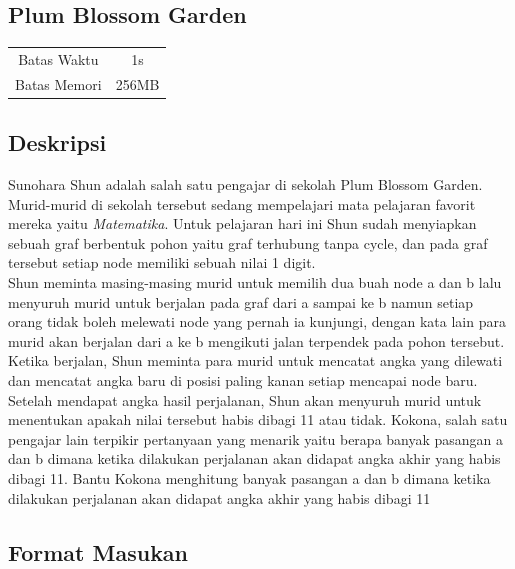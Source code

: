\documentclass{article}
\begin{document}
\begin{center}

    
    \section*{Plum Blossom Garden} %

    \begin{tabular}{ | c c | }
        \hline
        Batas Waktu  & 1s \\    %
        Batas Memori & 256MB \\  %
        \hline
    \end{tabular}
\end{center}

\subsection*{Deskripsi}

Sunohara Shun adalah salah satu pengajar di sekolah Plum Blossom Garden. Murid-murid di sekolah tersebut sedang mempelajari mata pelajaran favorit mereka yaitu \emph{Matematika}. Untuk pelajaran hari ini Shun sudah menyiapkan sebuah graf berbentuk pohon yaitu graf terhubung tanpa cycle, dan pada graf tersebut setiap node memiliki sebuah nilai 1 digit.\\

Shun meminta masing-masing murid untuk memilih dua buah node a dan b lalu menyuruh murid untuk berjalan pada graf dari a sampai ke b namun setiap orang tidak boleh melewati node yang pernah ia kunjungi, dengan kata lain para murid akan berjalan dari a ke b mengikuti jalan terpendek pada pohon tersebut. Ketika berjalan, Shun meminta para murid untuk mencatat angka yang dilewati dan mencatat angka baru di posisi paling kanan setiap mencapai node baru. Setelah mendapat angka hasil perjalanan, Shun akan menyuruh murid untuk menentukan apakah nilai tersebut habis dibagi 11 atau tidak. Kokona, salah satu pengajar lain terpikir pertanyaan yang menarik yaitu berapa banyak pasangan a dan b dimana ketika dilakukan perjalanan akan didapat angka akhir yang habis dibagi 11. Bantu Kokona menghitung banyak pasangan a dan b dimana ketika dilakukan perjalanan akan didapat angka akhir yang habis dibagi 11

\subsection*{Format Masukan}
\end{document}

